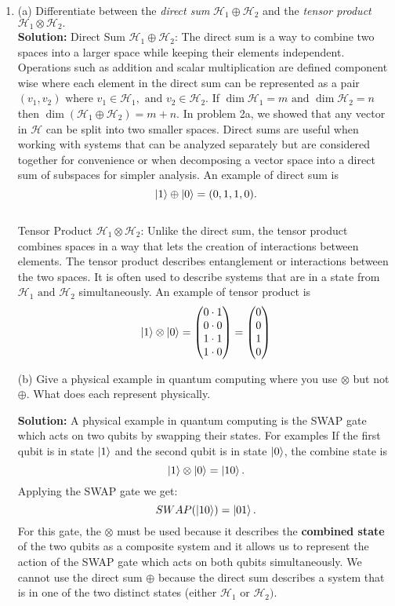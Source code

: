 \documentclass{article}
\theoremstyle{plain}
\numberwithin{thm}{section}
\theoremstyle{definition}
\begin{document}
\begin{enumerate}
    \item (a) Differentiate between the \textit{direct sum} $\mathcal{H}_1 \oplus \mathcal{H}_2$ and the \textit{tensor product} $\mathcal{H}_1\otimes \mathcal{H}_2.$ \\
    
    \textbf{Solution:} 
    Direct Sum $\mathcal{H}_1 \oplus \mathcal{H}_2$: The direct sum is a way to combine two spaces into a larger space while keeping their elements independent. Operations such as addition and scalar multiplication are defined component wise where each element in the direct sum can be represented as a pair $(v_1, v_2) \text{ where } v_1 \in \mathcal{H}_1, \text{ and } v_2 \in \mathcal{H}_2$. If $\dim \mathcal{H}_1 =m \text{ and } \dim \mathcal{H}_2=n$ then $\dim(\mathcal{H}_1 \oplus \mathcal{H}_2) = m + n.$ In problem 2a, we showed that any vector in $\mathcal{H}$ can be split into two smaller spaces. Direct sums are useful when working with systems that can be analyzed separately but are considered together for convenience or when decomposing a vector space into a direct sum of subspaces for simpler analysis. An example of direct sum is $$\ket{1} \oplus \ket{0} = (0,1,1,0).$$\\

    Tensor Product $\mathcal{H}_1\otimes \mathcal{H}_2$: Unlike the direct sum, the tensor product combines spaces in a way that lets the creation of interactions between elements. The tensor product describes entanglement or interactions between the two spaces. It is often used to describe systems that are in a state from $\mathcal{H}_1 \text{ and } \mathcal{H}_2$ simultaneously. An example of tensor product is $$\ket{1} \otimes \ket{0} = \begin{pmatrix}
    0 \cdot 1 \\
    0 \cdot 0 \\
    1 \cdot 1 \\
    1 \cdot 0
    \end{pmatrix} = \begin{pmatrix}
    0 \\
    0 \\
    1 \\
    0
    \end{pmatrix}$$
    

    (b) Give a physical example in quantum computing where you use $\otimes$ but not $\oplus$. What does each represent physically.
    
    \textbf{Solution:} A physical example in quantum computing is the SWAP gate which acts on two qubits by swapping their states.  For examples If the first qubit is in state $\ket{1}$ and the second qubit is in state $\ket{0}$, the combine state is $$\ket{1} \otimes \ket{0} = \ket{10}.$$ Applying the SWAP gate we get: $$SWAP(\ket{10})=\ket{01}.$$ For this gate, the $\otimes$ must be used because it describes the \textbf{combined state} of the two qubits as a composite system and it allows us to represent the action of the SWAP gate which acts on both qubits simultaneously. We cannot use the direct sum $\oplus$ because the direct sum describes a system that is in one of the two distinct states (either $\mathcal{H}_1 \text{ or } \mathcal{H}_2).$
    
\end{enumerate}
\end{document}
